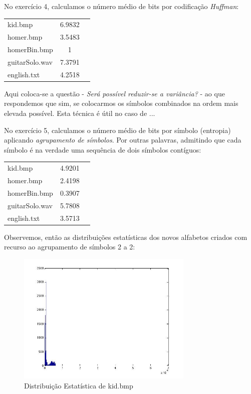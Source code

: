 \documentclass[12pt]{article}
\begin{document}
  \pagebreak

  No exercício 4, calculamos o número médio de bits por codificação
  \textit{Huffman}:

  \begin{tabular}{ l c r }
    kid.bmp & 6.9832 \\
    homer.bmp & 3.5483 \\
    homerBin.bmp & 1 \\
    guitarSolo.wav & 7.3791 \\
    english.txt & 4.2518 \\
  \end{tabular}

  Aqui coloca-se a questão - \textit{Será possível reduzir-se a variância?} -
  ao que respondemos que sim, se colocarmos os símbolos combinados na ordem
  mais elevada possível. Esta técnica é útil no caso de ...


  No exercício 5, calculamos o número médio de bits por símbolo (entropia)
  aplicando \textit{agrupamento de símbolos}. Por outras palavras, admitindo
  que cada símbolo é na verdade uma sequência de dois símbolos contíguos:

  \begin{tabular}{ l c r }
    kid.bmp & 4.9201 \\
    homer.bmp & 2.4198 \\
    homerBin.bmp & 0.3907 \\
    guitarSolo.wav & 5.7808 \\
    english.txt & 3.5713 \\
  \end{tabular}

  Observemos, então as distribuições estatísticas dos novos alfabetos criados
  com recurso ao agrupamento de símbolos 2 a 2:

  \begin{figure}[H]
    \centering
      \includegraphics[width=0.75\textwidth]{ex5kid}
    \caption{Distribuição Estatística de kid.bmp}
  \end{figure}
\end{document}
